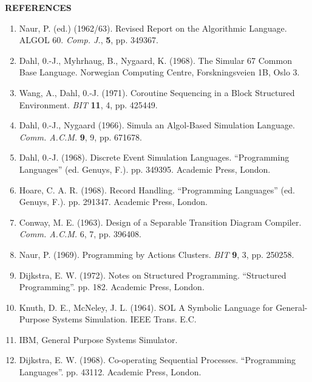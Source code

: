 \bigskip

\noindent
\textbf{REFERENCES}
\medskip\nopagebreak

\begin{enumerate}[leftmargin=*, itemsep=.1em, wide=0pt, align=left, label=(\arabic*)]
	\item \label{ref:1}
	Naur, P. (ed.) (1962/63). Revised Report on the Algorithmic Language. ALGOL 60. \textit{Comp. J.}, \textbf{5}, pp. 349\textendash{}367.
	
	\item \label{ref:2}
	Dahl, 0.-J., Myhrhaug, B., Nygaard, K. (1968). The Simular 67 Common Base Language. Norwegian Computing Centre, Forskningsveien 1B, Oslo 3.
	
	\item \label{ref:3}
	Wang, A., Dahl, 0.-J. (1971). Coroutine Sequencing in a Block Structured Environment. \textit{BIT} \textbf{11}, 4, pp. 425\textendash{}449.
	
	\item \label{ref:4}
	Dahl, 0.-J., Nygaard (1966). Simula \textemdash{} an Algol-Based Simulation Language. \textit{Comm. A.C.M.} \textbf{9}, 9, pp. 671\textendash{}678. 
	
	\item \label{ref:5}
	Dahl, 0.-J. (1968). Discrete Event Simulation Languages. ``Programming Languages'' (ed. Genuys, F.). pp. 349\textendash{}395. Academic Press, London.
	
	\item \label{ref:6}
	Hoare, C. A. R. (1968). Record Handling. ``Programming Languages'' (ed. Genuys, F.). pp. 291\textendash{}347. Academic Press, London.
	
	\item \label{ref:7}
	Conway, M. E. (1963). Design of a Separable Transition \textemdash{} Diagram Compiler. \textit{Comm. A.C.M.} 6, 7, pp. 396\textendash{}408.
	
	\item \label{ref:8}
	Naur, P. (1969). Programming by Actions Clusters. \textit{BIT} \textbf{9}, 3, pp. 250\textendash{}258.
	
	\item \label{ref:9}
	Dijkstra, E. W. (1972). Notes on Structured Programming. ``Structured Programming''. pp. 1\textendash{}82. Academic Press, London.
	
	\item \label{ref:10}
	Knuth, D. E., McNeley, J. L. (1964). SOL \textemdash{} A Symbolic Language for General-Purpose Systems Simulation. IEEE Trans. E.C.
	
	\item \label{ref:11}
	IBM, General Purpose Systems Simulator.
	
	\item \label{ref:12}
	Dijkstra, E. W. (1968). Co-operating Sequential Processes. ``Programming Languages''. pp. 43\textendash{}112. Academic Press, London.
\end{enumerate}